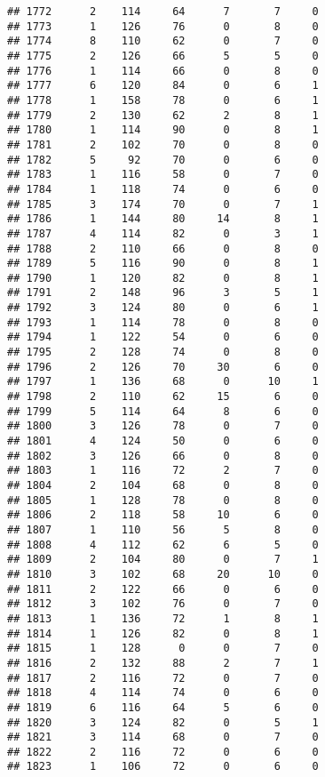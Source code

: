 \documentclass[
]{article}
\begin{document}
\begin{verbatim}
## 1772      2    114     64      7       7     0
## 1773      1    126     76      0       8     0
## 1774      8    110     62      0       7     0
## 1775      2    126     66      5       5     0
## 1776      1    114     66      0       8     0
## 1777      6    120     84      0       6     1
## 1778      1    158     78      0       6     1
## 1779      2    130     62      2       8     1
## 1780      1    114     90      0       8     1
## 1781      2    102     70      0       8     0
## 1782      5     92     70      0       6     0
## 1783      1    116     58      0       7     0
## 1784      1    118     74      0       6     0
## 1785      3    174     70      0       7     1
## 1786      1    144     80     14       8     1
## 1787      4    114     82      0       3     1
## 1788      2    110     66      0       8     0
## 1789      5    116     90      0       8     1
## 1790      1    120     82      0       8     1
## 1791      2    148     96      3       5     1
## 1792      3    124     80      0       6     1
## 1793      1    114     78      0       8     0
## 1794      1    122     54      0       6     0
## 1795      2    128     74      0       8     0
## 1796      2    126     70     30       6     0
## 1797      1    136     68      0      10     1
## 1798      2    110     62     15       6     0
## 1799      5    114     64      8       6     0
## 1800      3    126     78      0       7     0
## 1801      4    124     50      0       6     0
## 1802      3    126     66      0       8     0
## 1803      1    116     72      2       7     0
## 1804      2    104     68      0       8     0
## 1805      1    128     78      0       8     0
## 1806      2    118     58     10       6     0
## 1807      1    110     56      5       8     0
## 1808      4    112     62      6       5     0
## 1809      2    104     80      0       7     1
## 1810      3    102     68     20      10     0
## 1811      2    122     66      0       6     0
## 1812      3    102     76      0       7     0
## 1813      1    136     72      1       8     1
## 1814      1    126     82      0       8     1
## 1815      1    128      0      0       7     0
## 1816      2    132     88      2       7     1
## 1817      2    116     72      0       7     0
## 1818      4    114     74      0       6     0
## 1819      6    116     64      5       6     0
## 1820      3    124     82      0       5     1
## 1821      3    114     68      0       7     0
## 1822      2    116     72      0       6     0
## 1823      1    106     72      0       6     0

\end{verbatim}
\end{document}
